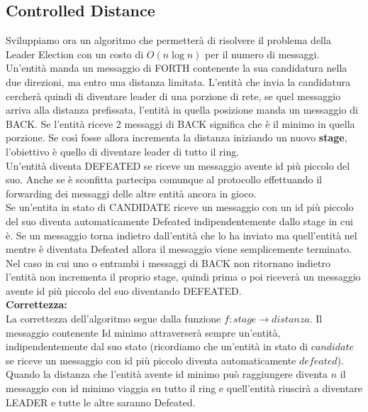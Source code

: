 \subsection{Controlled Distance}
Sviluppiamo ora un algoritmo che permetterà di risolvere il problema della Leader Election con un costo di $O(n \log n)$ per il numero di messaggi. Un'entità manda un messaggio di FORTH contenente la sua candidatura nella due direzioni, ma entro una distanza limitata. L'entità che invia la candidatura cercherà quindi di diventare leader di una porzione di rete, se quel messaggio arriva alla distanza prefissata, l'entità in quella posizione manda un messaggio di BACK. Se l'entità riceve 2 messaggi di BACK significa che è il minimo in quella porzione. Se così fosse allora incrementa la distanza iniziando un nuovo \textbf{stage}, l'obiettivo è quello di diventare leader di tutto il ring.\\
Un'entità diventa DEFEATED se riceve un messaggio avente id più piccolo del suo. Anche se è sconfitta partecipa comunque al protocollo effettuando il forwarding dei messaggi delle altre entità ancora in gioco.\\
Se un'entita in stato di CANDIDATE riceve un messaggio con un id più piccolo del suo diventa automaticamente Defeated indipendentemente dallo stage in cui è. Se un messaggio torna indietro dall'entità che lo ha inviato ma quell'entità nel mentre è diventata Defeated allora il messaggio viene semplicemente terminato.\\ Nel caso in cui uno o entrambi i messaggi di BACK non ritornano indietro l'entità non incrementa il proprio stage, quindi prima o poi riceverà un messaggio avente id più piccolo del suo diventando DEFEATED.\\
\textbf{Correttezza:}\\
La correttezza dell'algoritmo segue dalla funzione $f: stage \longrightarrow distanza $. Il messaggio contenente Id minimo attraverserà sempre un'entità, indipendentemente dal suo stato (ricordiamo che un'entità in stato di $candidate$ se riceve un messaggio con id più piccolo diventa automaticamente $defeated$). Quando la distanza che l'entità avente id minimo può raggiungere diventa $n$ il messaggio con id minimo viaggia su tutto il ring e quell'entità riuscirà a diventare LEADER e tutte le altre saranno Defeated.

